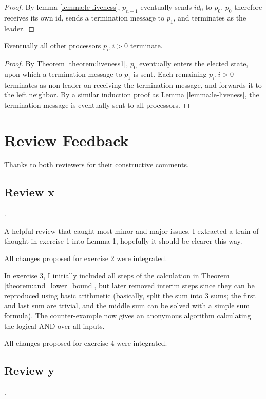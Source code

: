 \begin{proof}
By lemma \ref{lemma:le-liveness}, $p_{n-1}$ eventually sends $id_0$ to $p_0$.
$p_0$ therefore receives its own id, sends a termination message to $p_1$,
and terminates as the leader.
\end{proof}

\begin{theorem}
Eventually all other processors $p_i, i > 0$ terminate.
\end{theorem}

\begin{proof}
By Theorem \ref{theorem:liveness1}, $p_0$ eventually enters the elected state,
upon which a termination message to $p_1$ is sent. Each remaining $p_i, i > 0$ terminates
as non-leader on receiving the termination message, and forwards it to the left neighbor.
By a similar induction proof as Lemma \ref{lemma:le-liveness}, the termination message
is eventually sent to all processors.
\end{proof}

\section{Review Feedback}

Thanks to both reviewers for their constructive comments.

\subsection{Review x}.

A helpful review that caught most minor and major issues. I extracted a train of
thought in exercise 1 into Lemma 1, hopefully it should be clearer this way.

All changes proposed for exercise 2 were integrated.

In exercise 3, I initially
included all steps of the calculation in Theorem \ref{theorem:and_lower_bound},
but later removed interim steps since they can be reproduced using basic arithmetic
(basically, split the sum into 3 sums; the first and last sum are trivial, and
the middle sum can be solved with a simple sum formula). The counter-example
now gives an anonymous algorithm calculating the logical AND over all inputs.

All changes proposed for exercise 4 were integrated.

\subsection{Review y}.
